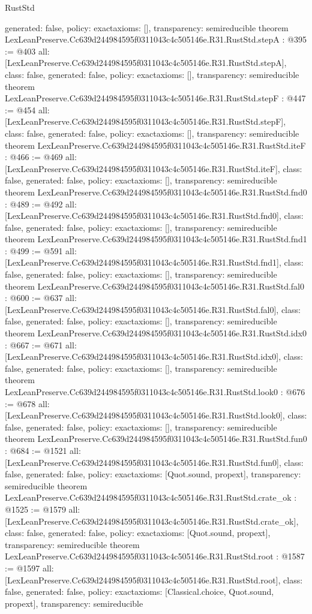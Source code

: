 \begin{lexlean}{RustStd}
\begin{coremodule}
{  generated: false,
  policy: exact{axioms: []},
  transparency: semireducible
}
theorem LexLeanPreserve.Cc639d244984595f0311043c4c505146e.R31.RustStd.stepA : @395 := @403 {
  all: [LexLeanPreserve.Cc639d244984595f0311043c4c505146e.R31.RustStd.stepA],
  class: false,
  generated: false,
  policy: exact{axioms: []},
  transparency: semireducible
}
theorem LexLeanPreserve.Cc639d244984595f0311043c4c505146e.R31.RustStd.stepF : @447 := @454 {
  all: [LexLeanPreserve.Cc639d244984595f0311043c4c505146e.R31.RustStd.stepF],
  class: false,
  generated: false,
  policy: exact{axioms: []},
  transparency: semireducible
}
theorem LexLeanPreserve.Cc639d244984595f0311043c4c505146e.R31.RustStd.iteF : @466 := @469 {
  all: [LexLeanPreserve.Cc639d244984595f0311043c4c505146e.R31.RustStd.iteF],
  class: false,
  generated: false,
  policy: exact{axioms: []},
  transparency: semireducible
}
theorem LexLeanPreserve.Cc639d244984595f0311043c4c505146e.R31.RustStd.fnd0 : @489 := @492 {
  all: [LexLeanPreserve.Cc639d244984595f0311043c4c505146e.R31.RustStd.fnd0],
  class: false,
  generated: false,
  policy: exact{axioms: []},
  transparency: semireducible
}
theorem LexLeanPreserve.Cc639d244984595f0311043c4c505146e.R31.RustStd.fnd1 : @499 := @591 {
  all: [LexLeanPreserve.Cc639d244984595f0311043c4c505146e.R31.RustStd.fnd1],
  class: false,
  generated: false,
  policy: exact{axioms: []},
  transparency: semireducible
}
theorem LexLeanPreserve.Cc639d244984595f0311043c4c505146e.R31.RustStd.fal0 : @600 := @637 {
  all: [LexLeanPreserve.Cc639d244984595f0311043c4c505146e.R31.RustStd.fal0],
  class: false,
  generated: false,
  policy: exact{axioms: []},
  transparency: semireducible
}
theorem LexLeanPreserve.Cc639d244984595f0311043c4c505146e.R31.RustStd.idx0 : @667 := @671 {
  all: [LexLeanPreserve.Cc639d244984595f0311043c4c505146e.R31.RustStd.idx0],
  class: false,
  generated: false,
  policy: exact{axioms: []},
  transparency: semireducible
}
theorem LexLeanPreserve.Cc639d244984595f0311043c4c505146e.R31.RustStd.look0 : @676 := @678 {
  all: [LexLeanPreserve.Cc639d244984595f0311043c4c505146e.R31.RustStd.look0],
  class: false,
  generated: false,
  policy: exact{axioms: []},
  transparency: semireducible
}
theorem LexLeanPreserve.Cc639d244984595f0311043c4c505146e.R31.RustStd.fun0 : @684 := @1521 {
  all: [LexLeanPreserve.Cc639d244984595f0311043c4c505146e.R31.RustStd.fun0],
  class: false,
  generated: false,
  policy: exact{axioms: [Quot.sound, propext]},
  transparency: semireducible
}
theorem LexLeanPreserve.Cc639d244984595f0311043c4c505146e.R31.RustStd.crate_ok : @1525 := @1579 {
  all: [LexLeanPreserve.Cc639d244984595f0311043c4c505146e.R31.RustStd.crate_ok],
  class: false,
  generated: false,
  policy: exact{axioms: [Quot.sound, propext]},
  transparency: semireducible
}
theorem LexLeanPreserve.Cc639d244984595f0311043c4c505146e.R31.RustStd.root : @1587 := @1597 {
  all: [LexLeanPreserve.Cc639d244984595f0311043c4c505146e.R31.RustStd.root],
  class: false,
  generated: false,
  policy: exact{axioms: [Classical.choice, Quot.sound, propext]},
  transparency: semireducible
}


\end{coremodule}
\end{lexlean}
